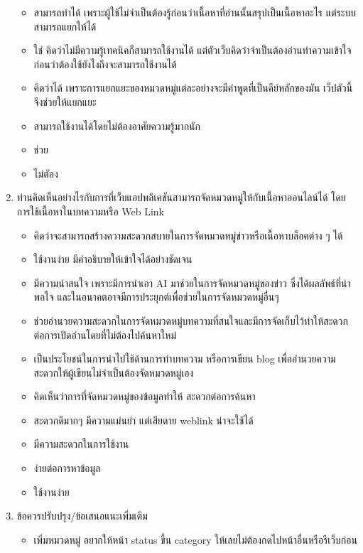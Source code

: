 \documentclass[12pt,oneside,openright,a4paper]{cpe-thai-project}
\begin{document}
\begin{enumerate}
\begin{itemize}
          \item สามารถทำได้ เพราะผู้ใช้ไม่จำเป็นต้องรู้ก่อนว่าเนื้อหาที่อ่านนั้นสรุปเป็นเนื้อหาอะไร แต่ระบบสามารถแยกให้ได้
          \item ใช่ คิดว่าไม่มีความรู้เทคนิคก็สามารถใช้งานได้ แต่ตัวเว็บคิดว่าจำเป็นต้องอ่านทำความเข้าใจก่อนว่าต้องใช้ยังไงถึงจะสามารถใช้งานได้
          \item คิดว่าได้ เพราะการแยกแยะของหมวดหมู่แต่ละอย่างจะมีคำพูดที่เป็นคีย์หลักของมัน เว็ปตัวนี้จึงช่วยให้แยกแยะ
          \item สามารถใช้งานได้โดยไม่ต้องอาศัยความรู้มากนัก
          \item ช่วย
          \item ไม่ตัอง
        \end{itemize}
  \item ท่านคิดเห็นอย่างไรกับการที่เว็บแอปพลิเคชันสามารถจัดหมวดหมู่ให้กับเนื้อหาออนไลน์ได้ โดยการใช้เนื้อหาในบทความหรือ Web Link
        \begin{itemize}
          \item คิดว่าจะสามารถสร้างความสะดวกสบายในการจัดหมวดหมู่ข่าวหรือเนื้อหาบล็อคต่าง ๆ ได้
          \item ใช้งานง่าย มีคำอธิบายให้เข้าใจได้อย่างชัดเจน 
          \item มีความน่าสนใจ เพราะมีการนำเอา AI มาช่วยในการจัดหมวดหมู่ของข่าว ซึ่งได้ผลลัพธ์ที่น่าพอใจ และในอนาคตอาจมีการประยุกต์เพื่อช่วยในการจัดหมวดหมู่อื่นๆ
          \item ช่วยอำนวยความสะดวกในการจัดหมวดหมู่บทความที่สนใจและมีการจัดเก็บไว้ทำให้สะดวกต่อการเปิดอ่านโดยที่ไม่ต้องไปค้นหาใหม่
          \item เป็นประโยชน์ในการนำไปใช้ด้านการทำบทความ หรือการเขียน blog เพื่ออำนวยความสะดวกให้ผู้เขียนไม่จำเป็นต้องจัดหมวดหมู่เอง
          \item คิดเห็นว่าการที่จัดหมวดหมู่ของข้อมูลทำให้ สะดวกต่อการค้นหา 
          \item สะดวกดีมากๆ มีความแม่นยำ แต่เสียดาย weblink น่าจะใช้ได้
          \item มีความสะดวกในการใช้งาน
          \item ง่ายต่อการหาข้อมูล
          \item ใช้งานง่าย
        \end{itemize}
  \item ข้อควรปรับปรุง/ข้อเสนอแนะเพิ่มเติม
        \begin{itemize}
          \item เพิ่มหมวดหมู่ อยากให้หน้า status ขึ้น category ให้เลยไม่ต้องกดไปหน้าอื่นหรือรีเว็บก่อน

\end{itemize}
\end{enumerate}
\end{document}
